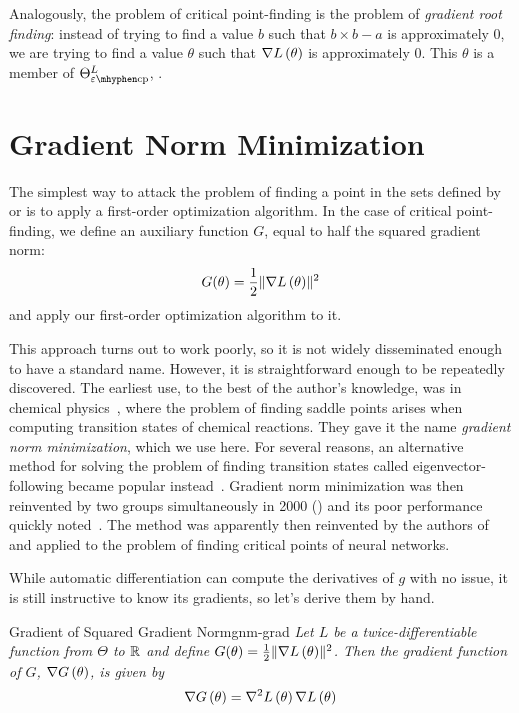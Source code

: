 \documentclass[../../thesis.tex]{subfiles}
\begin{document}
Analogously, the problem of critical point-finding
is the problem of \emph{gradient root finding}:
instead of trying to find a value $b$ such that
$b\times b - a$
is approximately $0$,
we are trying to find a value $\theta$ such that
$\nabla L\left(\theta\right)$
is approximately $0$.
This $\theta$ is a member of $\Theta^L_{\ecp}$,
.

\section{Gradient Norm Minimization}

The simplest way to attack the problem
of finding a point in
the sets defined by  or 
is to apply a first-order optimization algorithm.
In the case of critical point-finding,
we define an auxiliary function $G$,
equal to half the squared gradient norm:
\begin{equation}\equationlabel{def-g}
	G(\theta) = \frac{1}{2}\sgn{L}{\theta}
\end{equation}
\noindent and apply our first-order optimization algorithm to it.

This approach turns out to work poorly,
so it is not widely disseminated enough to have a standard name.
However, it is straightforward enough to be repeatedly discovered.
The earliest use, to the best of the author's knowledge,
was in chemical physics~\cite{mciver1972},
where the problem of finding saddle points arises
when computing transition states of chemical reactions.
They gave it the name \emph{gradient norm minimization},
which we use here.
For several reasons, an alternative method
for solving the problem of finding transition states
called eigenvector-following became popular instead~\cite{cerjan1981}.
Gradient norm minimization was then reinvented by two groups simultaneously in 2000
(\cite{angelani2000,broderix2000})
and its poor performance quickly noted~\cite{doye2002}.
The method was apparently then reinvented by the authors of%
~\cite{pennington2017}
and applied to the problem of finding critical points of neural networks.

While automatic differentiation can compute the derivatives of $g$ with no issue,
it is still instructive to know its gradients,
so let's derive them by hand.

\begin{theorem}{Gradient of Squared Gradient Norm}{gnm-grad}
	\emph{Let $L$ be a twice-differentiable function
	from $\Theta$ to $\mathbb{R}$
	and define $G(\theta) = \frac{1}{2}\lVert\nabla L\left(\theta\right)\rVert^2$.
	Then the gradient function of $G$, $\nabla G\left(\theta\right)$,
	is given by
	\begin{equation}
		\nabla G\left(\theta\right) = \nabla^2L\left(\theta\right)\nabla L\left(\theta\right)
	\end{equation}
	}
\end{theorem}
\end{document}
